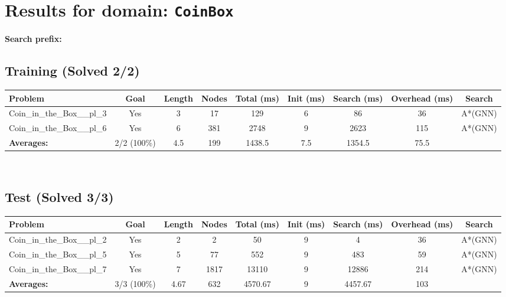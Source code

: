\documentclass{article}
\begin{document}
\section*{Results for domain: \texttt{CoinBox}}
\textbf{Search prefix:} 
\\[0.5cm]
\subsection*{Training (Solved 2/2)}
\begin{tabular}{lcccccccc}
\toprule
Problem & Goal & Length & Nodes & Total (ms) & Init (ms) & Search (ms) & Overhead (ms) & Search \\
\midrule
Coin\_in\_the\_Box\_\_pl\_3 & Yes & 3 & 17 & 129 & 6 & 86 & 36 & A*(GNN) \\
Coin\_in\_the\_Box\_\_pl\_6 & Yes & 6 & 381 & 2748 & 9 & 2623 & 115 & A*(GNN) \\
\textbf{Averages:} & 2/2 (100\%) & 4.5 & 199 & 1438.5 & 7.5 & 1354.5 & 75.5 & \\
\bottomrule
\end{tabular}
\\[0.7cm]
\subsection*{Test (Solved 3/3)}
\begin{tabular}{lcccccccc}
\toprule
Problem & Goal & Length & Nodes & Total (ms) & Init (ms) & Search (ms) & Overhead (ms) & Search \\
\midrule
Coin\_in\_the\_Box\_\_pl\_2 & Yes & 2 & 2 & 50 & 9 & 4 & 36 & A*(GNN) \\
Coin\_in\_the\_Box\_\_pl\_5 & Yes & 5 & 77 & 552 & 9 & 483 & 59 & A*(GNN) \\
Coin\_in\_the\_Box\_\_pl\_7 & Yes & 7 & 1817 & 13110 & 9 & 12886 & 214 & A*(GNN) \\
\textbf{Averages:} & 3/3 (100\%) & 4.67 & 632 & 4570.67 & 9 & 4457.67 & 103 & \\
\bottomrule
\end{tabular}
\\[0.7cm]
\end{document}
